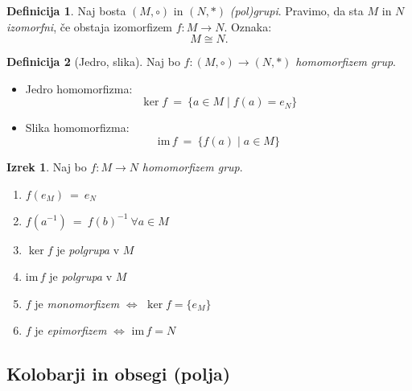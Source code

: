 \documentclass[11pt]{article}
\newcommand{\0}{\mathbf{0}}
\newcommand{\M}{M}
\newcommand{\NN}{N}
\newcommand{\im}{\text{im}\,}
\theoremstyle{definition}
\newtheorem{definicija}{Definicija}[section]
\theoremstyle{definition}
\theoremstyle{definition}
\newtheorem{izrek}{Izrek}[section]
\theoremstyle{definition}
\begin{document}
\begin{definicija}

Naj bosta $(M, \circ)$ in $(\NN, *)$ \textit{(pol)grupi}. Pravimo, da sta $\M$ in $\NN$ \textit{izomorfni}, če obstaja izomorfizem $f: \M \rightarrow \NN$. Oznaka:
$$\M \cong \NN.$$

\end{definicija}
\vspace{0.5cm}

\begin{definicija}[Jedro, slika]

Naj bo $f:(\M, \circ) \rightarrow (\NN, *)$ \textit{homomorfizem grup}.
\begin{itemize}
	\item Jedro homomorfizma:
	$$\ker f ~=~ \{a \in \M \mid f(a) = e_\NN\}$$
	\item Slika homomorfizma:
	$$\im f ~=~ \{f(a) \mid a \in \M\}$$
\end{itemize}

\end{definicija}
\vspace{0.5cm}

\begin{izrek}

Naj bo $f: \M \rightarrow \NN$ \textit{homomorfizem grup}.
\begin{enumerate}
	\item $f(e_\M) ~=~ e_\NN$
	\item $f(a^{-1}) ~=~ f(b)^{-1} ~\forall a \in \M$
	\item $\ker f$ je \textit{polgrupa} v $\M$
	\item $\im f$ je \textit{polgrupa} v $\M$
	\item $f$ je \textit{monomorfizem} $\iff$ $\ker f = \{e_\M\}$
	\item $f$ je \textit{epimorfizem} $\iff$ $\im f = \NN$
\end{enumerate}

\end{izrek}
\vspace{0.5cm}


\subsection{Kolobarji in obsegi (polja)}
\vspace{0.5cm}
\end{document}
